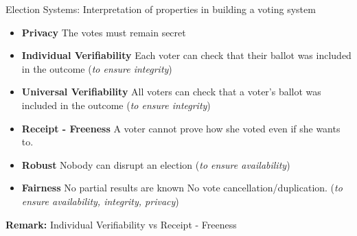 \documentclass{beamer}
\begin{document}
\begin{frame}{Election Systems: Interpretation of properties in building a voting system}
\begin{itemize}
\item \textbf{Privacy} The votes must remain secret
\item \textbf{Individual Verifiability} Each voter can check that their ballot was included in the outcome (\textit{to ensure integrity})
\item \textbf{Universal Verifiability} All voters can check that a voter's ballot was included in the outcome (\textit{to ensure integrity})
\item \textbf{Receipt - Freeness} A voter cannot prove how she voted even if she wants to.
\item \textbf{Robust} Nobody can disrupt an election (\textit{to ensure availability})
\item \textbf{Fairness} No partial results are known No vote cancellation/duplication.  (\textit{to ensure availability, integrity, privacy})
\end{itemize}
\textbf{Remark: }Individual Verifiability vs Receipt - Freeness
\end{frame}
\end{document}
